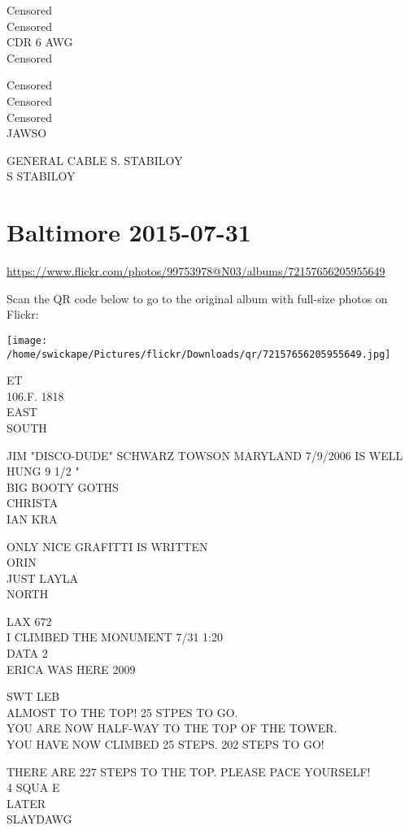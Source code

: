 \documentclass[10pt,letterpaper]{article}
\begin{document}
Censored\\
Censored\\
CDR 6 AWG\\
Censored

Censored\\
Censored\\
Censored\\
JAWSO

GENERAL CABLE S. STABILOY\\
S STABILOY


\section*{Baltimore 2015-07-31}

\url{https://www.flickr.com/photos/99753978@N03/albums/72157656205955649}

Scan the QR code below to go to the original album with full-size photos on Flickr:

\texttt{[image: /home/swickape/Pictures/flickr/Downloads/qr/72157656205955649.jpg]}


ET\\
106.F. 1818\\
EAST\\
SOUTH

JIM "DISCO{-}DUDE" SCHWARZ TOWSON MARYLAND 7/9/2006 IS WELL HUNG 9 1/2 "\\
BIG BOOTY GOTHS\\
CHRISTA\\
IAN KRA

ONLY NICE GRAFITTI IS WRITTEN\\
ORIN\\
JUST LAYLA\\
NORTH

LAX 672\\
I CLIMBED THE MONUMENT 7/31 1:20\\
DATA 2\\
ERICA WAS HERE 2009

SWT LEB\\
ALMOST TO THE TOP!  25 STPES TO GO.\\
YOU ARE NOW HALF{-}WAY TO THE TOP OF THE TOWER.\\
YOU HAVE NOW CLIMBED 25 STEPS.  202 STEPS TO GO!

THERE ARE 227 STEPS TO THE TOP.  PLEASE PACE YOURSELF!\\
4 SQUA E\\
LATER\\
SLAYDAWG
\end{document}
